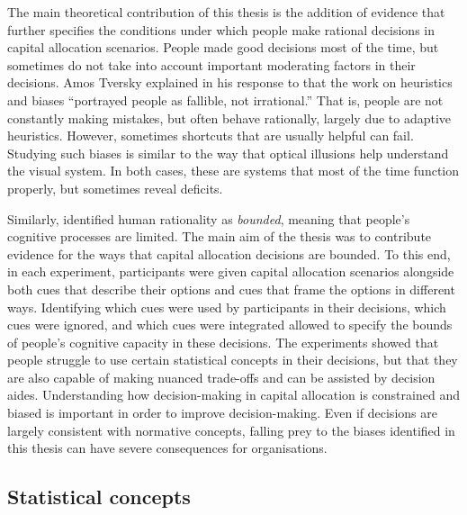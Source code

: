 \documentclass[a4paper, nobind, dvipsnames]{templates/ociamthesis}
\theoremstyle{definition}
\theoremstyle{definition}
\theoremstyle{definition}
\theoremstyle{definition}
\theoremstyle{remark}
\begin{document}
The main theoretical contribution of this thesis is the addition of evidence
that further specifies the conditions under which people make rational decisions
in capital allocation scenarios. People made good decisions most of the time,
but sometimes do not take into account important moderating factors in their
decisions. Amos Tversky explained in his response to \textcite[p.~355]{cohen1981} that
the work on heuristics and biases ``portrayed people as fallible, not
irrational.'' That is, people are not constantly making mistakes, but often
behave rationally, largely due to adaptive heuristics. However, sometimes
shortcuts that are usually helpful can fail. Studying such biases is similar to
the way that optical illusions help understand the visual system. In both cases,
these are systems that most of the time function properly, but sometimes reveal
deficits.

Similarly, \textcite{simon1955} identified human rationality as \emph{bounded}, meaning that
people's cognitive processes are limited. The main aim of the thesis was to
contribute evidence for the ways that capital allocation decisions are bounded.
To this end, in each experiment, participants were given capital allocation
scenarios alongside both cues that describe their options and cues that frame
the options in different ways. Identifying which cues were used by participants
in their decisions, which cues were ignored, and which cues were integrated
allowed to specify the bounds of people's cognitive capacity in these decisions.
The experiments showed that people struggle to use certain statistical concepts
in their decisions, but that they are also capable of making nuanced trade-offs
and can be assisted by decision aides. Understanding how decision-making in
capital allocation is constrained and biased is important in order to improve
decision-making. Even if decisions are largely consistent with normative
concepts, falling prey to the biases identified in this thesis can have severe
consequences for organisations.

\subsection{Statistical concepts}
\end{document}
